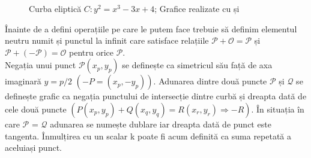 \begin{figure}[H]
    \centering
    \qquad
    \caption{Curba eliptică $C: y^2 = x^3 - 3x + 4$; Grafice realizate cu \cite{WolframAlpha} și \cite{Graui}}
\end{figure}

Înainte de a defini operațiile pe care le putem face trebuie să definim elementul neutru numit și punctul la infinit care satisface relațiile $\mathcal{P} + \mathcal{O} = \mathcal{P}$ și $\mathcal{P} + (-\mathcal{P}) = \mathcal{O}$ pentru orice $\mathcal{P}$.\\

Negația unui punct $\mathcal{P}(x_p,y_p)$ se definește ca simetricul său față de axa imaginară $y = p/2$ $( -P = (x_p, -y_p) )$. Adunarea dintre două puncte $\mathcal{P}$ și $\mathcal{Q}$ se definește grafic ca negația punctului de intersecție dintre curbă și dreapta dată de cele două puncte $(P(x_p, y_p) + Q(x_q, y_q) = R(x_r, y_r) \Rightarrow -R)$. În situația în care $\mathcal{P}$ = $\mathcal{Q}$ adunarea se numește dublare iar dreapta dată de punct este tangenta. Înmulțirea cu un scalar k poate fi acum definită ca suma repetată a aceluiași punct.\\

